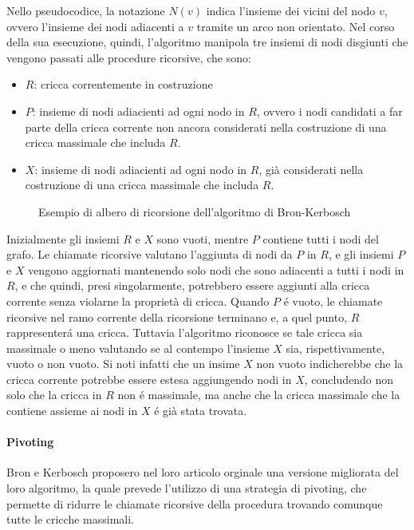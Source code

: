 Nello pseudocodice, la notazione $N(v)$ indica l'insieme dei vicini del nodo $v$, ovvero l'insieme dei nodi adiacenti
a $v$ tramite un arco non orientato.
Nel corso della sua esecuzione, quindi, l'algoritmo manipola tre insiemi di nodi disgiunti che vengono passati
alle procedure ricorsive, che sono:
\begin{itemize}
    \item $R$: cricca correntemente in costruzione
    \item $P$: insieme di nodi adiacienti ad ogni nodo in $R$, ovvero i nodi candidati a far parte della cricca corrente
    non ancora considerati nella costruzione di una cricca massimale che includa $R$.
    \item $X$: insieme di nodi adiacienti ad ogni nodo in $R$, gi\`a considerati nella costruzione di una cricca
    massimale che includa $R$.
\end{itemize}

\begin{figure}[H]
    \centering
    
    \caption{Esempio di albero di ricorsione dell'algoritmo di Bron-Kerbosch}
    \label{fig:bron_kerbosh_tree_example}
\end{figure}

Inizialmente gli insiemi $R$ e $X$ sono vuoti, mentre $P$ contiene tutti i nodi del grafo.
Le chiamate ricorsive valutano l'aggiunta di nodi da $P$ in $R$, e gli insiemi $P$ e $X$ vengono aggiornati
mantenendo solo nodi che sono adiacenti a tutti i nodi in $R$, e che quindi, presi singolarmente, potrebbero
essere aggiunti alla cricca corrente senza violarne la propriet\`a di cricca.
Quando $P$ \'e vuoto, le chiamate ricorsive nel ramo corrente della ricorsione terminano e, a quel punto,
$R$ rappresenter\'a una cricca.
Tuttavia l'algoritmo riconosce se tale cricca sia massimale o meno valutando se al contempo l'insieme $X$ sia,
rispettivamente, vuoto o non vuoto.
Si noti infatti che un insime $X$ non vuoto indicherebbe che la cricca corrente potrebbe essere estesa aggiungendo
nodi in $X$, concludendo non solo che la cricca in $R$ non \'e massimale, ma anche che la cricca massimale che
la contiene assieme ai nodi in $X$ \'e gi\`a stata trovata. \newline

\paragraph{Pivoting} \newline
Bron e Kerbosch proposero nel loro articolo orginale una versione migliorata del loro algoritmo, la quale
prevede l'utilizzo di una strategia di pivoting, che permette di ridurre le chiamate ricorsive della procedura
trovando comunque tutte le cricche massimali.

